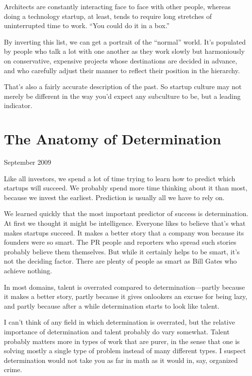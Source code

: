 \documentclass[12pt]{book}
\begin{document}
Architects are constantly interacting face to face with other people,
whereas doing a technology startup, at least, tends to require long
stretches of uninterrupted time to work. ``You could do it in a box.''

By inverting this list, we can get a portrait of the ``normal'' world.
It's populated by people who talk a lot with one another as they work
slowly but harmoniously on conservative, expensive projects whose
destinations are decided in advance, and who carefully adjust their
manner to reflect their position in the hierarchy.

That's also a fairly accurate description of the past. So startup
culture may not merely be different in the way you'd expect any
subculture to be, but a leading indicator.
\chapter{The Anatomy of Determination }

September 2009

Like all investors, we spend a lot of time trying to learn how to
predict which startups will succeed. We probably spend more time
thinking about it than most, because we invest the earliest. Prediction
is usually all we have to rely on.

We learned quickly that the most important predictor of success is
determination. At first we thought it might be intelligence. Everyone
likes to believe that's what makes startups succeed. It makes a better
story that a company won because its founders were so smart. The PR
people and reporters who spread such stories probably believe them
themselves. But while it certainly helps to be smart, it's not the
deciding factor. There are plenty of people as smart as Bill Gates who
achieve nothing.

In most domains, talent is overrated compared to determination---partly
because it makes a better story, partly because it gives onlookers an
excuse for being lazy, and partly because after a while determination
starts to look like talent.

I can't think of any field in which determination is overrated, but the
relative importance of determination and talent probably do vary
somewhat. Talent probably matters more in types of work that are purer,
in the sense that one is solving mostly a single type of problem instead
of many different types. I suspect determination would not take you as
far in math as it would in, say, organized crime.
\end{document}
